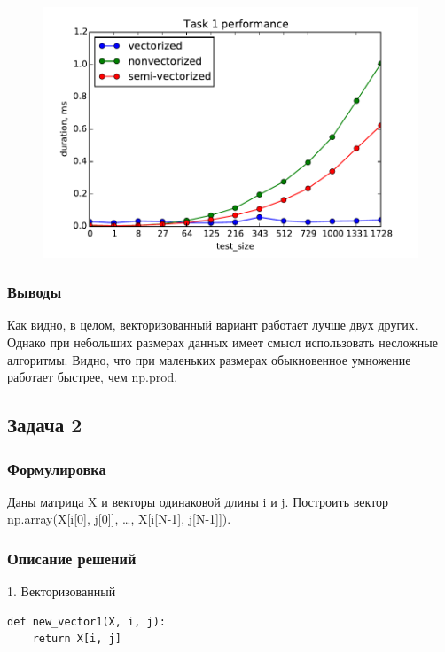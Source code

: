 \documentclass[12pt]{article}
\begin{document}
\begin{figure}[h]
	\begin{center}
		\includegraphics[scale=0.7]{task1}
	\end{center}
\end{figure}

\subsubsection*{Выводы}

Как видно, в целом, векторизованный вариант работает лучше двух других. Однако при небольших размерах данных имеет смысл использовать несложные алгоритмы. Видно, что при маленьких размерах обыкновенное умножение работает быстрее, чем np.prod.

\subsection{Задача 2}

\subsubsection*{Формулировка}

Даны матрица X и векторы одинаковой длины i и j. Построить вектор np.array(X[i[0], j[0]], \dots, X[i[N-1], j[N-1]]).

\newpage

\subsubsection*{Описание решений}

1. Векторизованный
\begin{lstlisting}
def new_vector1(X, i, j):
    return X[i, j]
\end{lstlisting}
\end{document}
